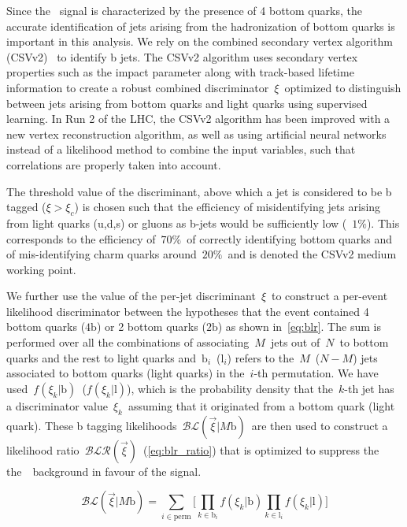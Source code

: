 Since the \ttHbb~signal is characterized by the presence of 4 bottom quarks, the accurate identification of jets arising from the hadronization of bottom quarks is important in this analysis. We rely on the combined secondary vertex algorithm (CSVv2)~\cite{Chatrchyan:2012jua} to identify b jets. The CSVv2 algorithm uses secondary vertex properties such as the impact parameter along with track-based lifetime information to create a robust combined discriminator~$\xi$~optimized to distinguish between jets arising from bottom quarks and light quarks using supervised learning. In Run 2 of the LHC, the CSVv2 algorithm has been improved with a new vertex reconstruction algorithm, as well as using artificial neural networks instead of a likelihood method to combine the input variables, such that correlations are properly taken into account\cite{CMS-PAS-BTV-15-001}.

The threshold value of the discriminant, above which a jet is considered to be b tagged ($\xi > \xi_c$) is chosen such that the efficiency of misidentifying jets arising from light quarks (u,d,s) or gluons as b-jets would be sufficiently low (~$1\%$). This corresponds to the efficiency of~$70\%$~of correctly identifying bottom quarks and of mis-identifying charm quarks around~$20\%$~and is denoted the CSVv2 medium working point.

We further use the value of the per-jet discriminant~$\xi$~to construct a per-event likelihood discriminator between the hypotheses that the event contained 4 bottom quarks ($4\mathrm{b}$) or 2 bottom quarks ($2\mathrm{b}$) as shown in~\cref{eq:blr}. The sum is performed over all the combinations of associating~$M$~jets out of~$N$~to bottom quarks and the rest to light quarks and~$\mathrm{b}_i$~($\mathrm{l}_i$) refers to the~$M$~($N-M$) jets associated to bottom quarks (light quarks) in the~$i$-th permutation. We have used~$f(\xi_k | \mathrm{b})$~($f(\xi_k | \mathrm{l})$), which is the probability density that the~$k$-th jet has a discriminator value~$\xi_k$~assuming that it originated from a bottom quark (light quark). These b tagging likelihoods~$\mathcal{BL}(\vec{\xi} | M\mathrm{b})$~are then used to construct a likelihood ratio~$\mathcal{BLR}(\vec{\xi})$~(\cref{eq:blr_ratio}) that is optimized to suppress the the~\ttlf~background in favour of the \ttHbb signal.

\begin{equation}
\label{eq:blr}
\mathcal{BL}(\vec{\xi} | M\mathrm{b}) = \sum_{i \in \mathrm{perm}} \biggl[ \prod_{k \in \mathrm{b}_i} f(\xi_k | \mathrm{b}) \prod_{k \in \mathrm{l}_i} f(\xi_k | \mathrm{l}) \biggr]
\end{equation}

